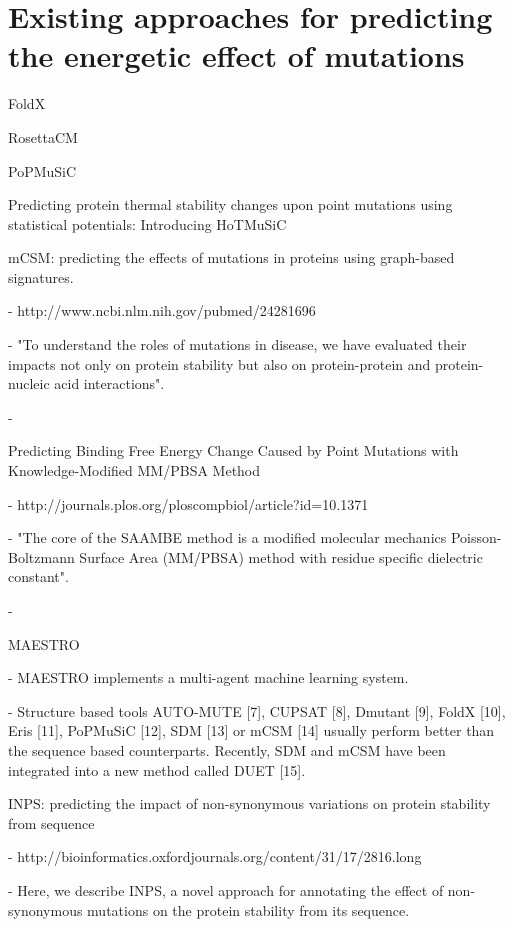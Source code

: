 \section{Existing approaches for predicting the energetic effect of mutations}


FoldX 


RosettaCM



PoPMuSiC


Predicting protein thermal stability changes upon point mutations using statistical potentials: Introducing HoTMuSiC


mCSM: predicting the effects of mutations in proteins using graph-based signatures.

  - http://www.ncbi.nlm.nih.gov/pubmed/24281696
  
  - "To understand the roles of mutations in disease, we have evaluated their impacts not only on protein stability but also on protein-protein and protein-nucleic acid interactions".

  - \cite{pires_mcsm_2014}


Predicting Binding Free Energy Change Caused by Point Mutations with Knowledge-Modified MM/PBSA Method

  - http://journals.plos.org/ploscompbiol/article?id=10.1371%
  
  - "The core of the SAAMBE method is a modified molecular mechanics Poisson-Boltzmann Surface Area (MM/PBSA) method with residue specific dielectric constant".

  - \cite{petukh_predicting_2015}


MAESTRO \cite{laimer_maestro_2015}

  
  - MAESTRO implements a multi-agent machine learning system.

  - Structure based tools AUTO-MUTE [7], CUPSAT [8], Dmutant [9], FoldX [10], Eris [11], PoPMuSiC [12], SDM [13] or mCSM [14] usually perform better than the sequence based counterparts. Recently, SDM and mCSM have been integrated into a new method called DUET [15].
  
 
INPS: predicting the impact of non-synonymous variations on protein stability from sequence

  - http://bioinformatics.oxfordjournals.org/content/31/17/2816.long
  
  - Here, we describe INPS, a novel approach for annotating the effect of non-synonymous mutations on the protein stability from its sequence.

